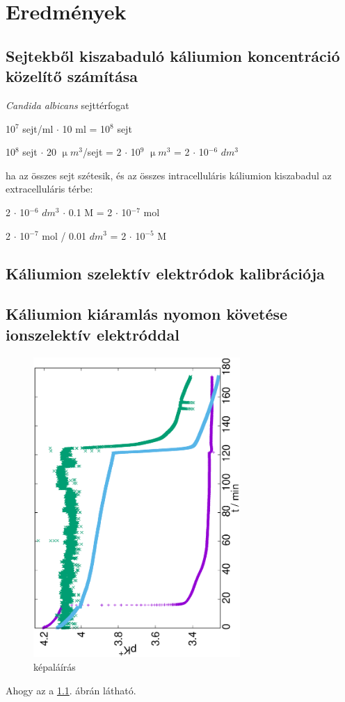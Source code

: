 \chapter{Eredmények}
\pagestyle{headings}


\section{Sejtekből kiszabaduló káliumion koncentráció közelítő számítása}

\emph{Candida albicans} sejttérfogat \cite{chaffin1984relationship}

10$^7$ sejt/ml $\cdot$ 10 ml = 10$^8$ sejt

10$^8$ sejt $\cdot$ 20 $\upmu m^3$/sejt = 2 $\cdot$ 10$^9$ $\upmu m^3$ = 2 $\cdot$ 10$^{-6}$ $dm^3$

ha az összes sejt szétesik, és az összes intracelluláris káliumion kiszabadul az extracelluláris térbe:

2 $\cdot$ 10$^{-6}$ $dm^3$ $\cdot$ 0.1 M = 2 $\cdot$ 10$^{-7}$ mol

2 $\cdot$ 10$^{-7}$ mol / 0.01 $dm^3$ = 2 $\cdot$ 10$^{-5}$ M

\section{Káliumion szelektív elektródok kalibrációja}

\section{Káliumion kiáramlás nyomon követése ionszelektív elektróddal}

\begin{figure}
\centering
\includegraphics[width=0.7\textwidth, angle=-90]{img/meres.eps}
\caption{képaláírás}
\label{fig:mérések}
\end{figure}

Ahogy az a \ref{fig:mérések}. ábrán látható.



